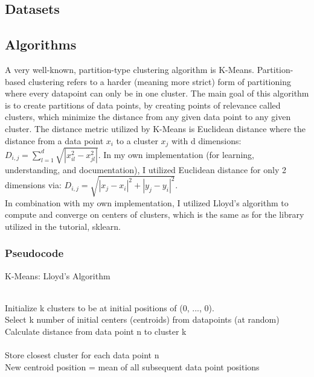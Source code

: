\documentclass[10pt,twocolumn]{article}
\begin{document}
\subsection {Datasets}

\indent 


\subsection {Algorithms}

\indent A very well-known, partition-type clustering algorithm is K-Means. Partition-based clustering refers to a harder (meaning more strict) form of partitioning where every datapoint can only be in one cluster. The main goal of this algorithm is to create partitions of data points, by creating points of relevance called clusters, which minimize the distance from any given data point to any given cluster. The distance metric utilized by K-Means is Euclidean distance where the distance from a data point \(x_i\) to a cluster \(x_j \) with d dimensions:
\(D_{i, j} = \sum_{l=1}^d \sqrt{|x_{il}^2 - x_{jl}^2|} \). In my own implementation (for learning, understanding, and documentation), I utilized Euclidean distance for only 2 dimensions via: \(D_{i, j} = \sqrt{{|x_{j} - x_{i}|^2} + {|y_{j} - y_{i}|^2}} \). \\ In combination with my own implementation, I utilized Lloyd’s algorithm to compute and converge on centers of clusters, which is the same as for the library utilized in the tutorial, sklearn.

\subsubsection {Pseudocode}

\begin{algorithm}
  \caption{ K-Means: Lloyd's Algorithm }
  \begin{algorithmic}[1] \\
    Initialize k clusters to be at initial positions of (0, ..., 0).\\
    Select k number of initial centers (centroids) from datapoints (at random)
       \\
        Calculate distance from data point n to cluster k \\
      \EndFor \\
        Store closest cluster for each data point n
     \EndFor \\
        New centroid position = mean of all subsequent data point positions
    \EndWhile
  \end{algorithmic}




\end{algorithm}
\end{document}

